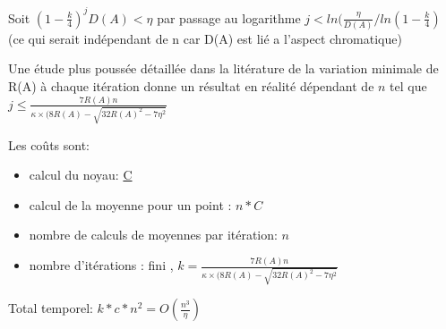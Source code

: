 \documentclass[12pt,a4paper]{article}
\newcommand{\ns}{\\\indent\indent\vspace{0.25cm}}
\begin{document}
Soit $(1-\frac{k}{4})^j D(A) < \eta$ par passage au logarithme
$j < ln(\frac{\eta}{D(A)}/ ln( 1 - \frac{k}{4})$ (ce qui serait indépendant de n car D(A) est lié a l'aspect chromatique)\ns


Une étude plus poussée détaillée dans la litérature de la variation minimale de R(A) à chaque itération donne un résultat en réalité dépendant de $n$ tel que $j \leq \frac{7R(A)n}{\kappa \times (8 R(A) - \sqrt{32R(A)^2 - 7 \eta^2}}$

Les coûts sont:
\begin{itemize}
\item calcul du noyau: \underline{C}
\item calcul de la moyenne pour un point : \underline{$n*C$}
\item nombre de calculs de moyennes par itération: \underline{$n$}
\item nombre d'itérations : fini , $k = \frac{7R(A)n}{\kappa \times (8 R(A) - \sqrt{32R(A)^2 - 7 \eta^2}}$
\end{itemize}

Total temporel: $k*c*n^2 = O(\frac{n^3}{\eta})$

    
\end{document}
